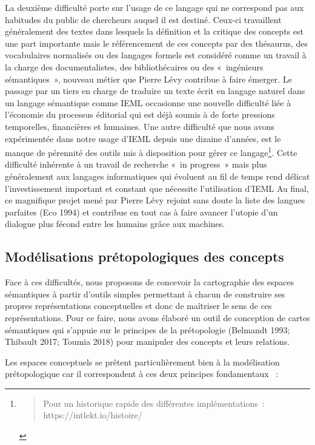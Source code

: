 \documentclass[
  letterpaper,
  DIV=11,
  numbers=noendperiod]{scrreprt}
\begin{document}
La deuxième difficulté porte sur l'usage de ce langage qui ne correspond
pas aux habitudes du public de chercheurs auquel il est destiné. Ceux-ci
travaillent généralement des textes dans lesquels la définition et la
critique des concepts est une part importante mais le référencement de
ces concepts par des thésaurus, des vocabulaires normalisés ou des
langages formels est considéré comme un travail à la charge des
documentalistes, des bibliothécaires ou des «~ingénieurs sémantiques~»,
nouveau métier que Pierre Lévy contribue à faire émerger. Le passage par
un tiers en charge de traduire un texte écrit en langage naturel dans un
langage sémantique comme IEML occasionne une nouvelle difficulté liée à
l'économie du processus éditorial qui est déjà soumis à de forte
pressions temporelles, financières et humaines. Une autre difficulté que
nous avons expérimentée dans notre usage d'IEML depuis une dizaine
d'années, est le manque de pérennité des outils mis à disposition pour
gérer ce langage\footnote{\begin{quote}
  Pour un historique rapide des différentes implémentations~:
  https://intlekt.io/histoire/
  \end{quote}}. Cette difficulté inhérente à un travail de recherche
«~in progress~» mais plus généralement aux langages informatiques qui
évoluent au fil de temps rend délicat l'investissement important et
constant que nécessite l'utilisation d'IEML Au final, ce magnifique
projet mené par Pierre Lévy rejoint sans doute la liste des langues
parfaites (Eco 1994) et contribue en tout cas à faire avancer l'utopie
d'un dialogue plus fécond entre les humains grâce aux machines.

\hypertarget{sec-modelisationsPretopologique}{%
\subsection{Modélisations prétopologiques des
concepts}\label{sec-modelisationsPretopologique}}

Face à ces difficultés, nous proposons de concevoir la cartographie des
espaces sémantiques à partir d'outils simples permettant à chacun de
construire ses propres représentations conceptuelles et donc de
maîtriser le sens de ces représentations. Pour ce faire, nous avons
élaboré un outil de conception de cartes sémantiques qui s'appuie sur le
principes de la prétopologie (Belmandt 1993; Thibault 2017; Toumia 2018)
pour manipuler des concepts et leurs relations.

Les espaces conceptuels se prêtent particulièrement bien à la
modélisation prétopologique car il correspondent à ces deux principes
fondamentaux ~:
\end{document}
